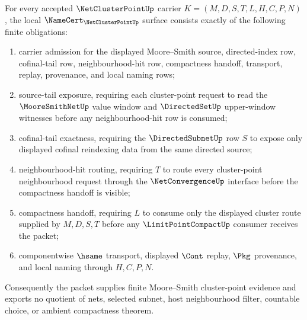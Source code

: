 \begin{theorem}\label{thm:net-cluster-point-namecert-obligations}
For every accepted $\NetClusterPointUp$ carrier $K=(M,D,S,T,L,H,C,P,N)$, the local $\NameCert_{\NetClusterPointUp}$ surface consists exactly of the following finite obligations:
\begin{enumerate}
\item carrier admission for the displayed Moore--Smith source, directed-index row, cofinal-tail row, neighbourhood-hit row, compactness handoff, transport, replay, provenance, and local naming rows;
\item source-tail exposure, requiring each cluster-point request to read the $\MooreSmithNetUp$ value window and $\DirectedSetUp$ upper-window witnesses before any neighbourhood-hit row is consumed;
\item cofinal-tail exactness, requiring the $\DirectedSubnetUp$ row $S$ to expose only displayed cofinal reindexing data from the same directed source;
\item neighbourhood-hit routing, requiring $T$ to route every cluster-point neighbourhood request through the $\NetConvergenceUp$ interface before the compactness handoff is visible;
\item compactness handoff, requiring $L$ to consume only the displayed cluster route supplied by $M,D,S,T$ before any $\LimitPointCompactUp$ consumer receives the packet;
\item componentwise $\hsame$ transport, displayed $\Cont$ replay, $\Pkg$ provenance, and local naming through $H,C,P,N$.
\end{enumerate}
Consequently the packet supplies finite Moore--Smith cluster-point evidence and exports no quotient of nets, selected subnet, host neighbourhood filter, countable choice, or ambient compactness theorem.
\end{theorem}
